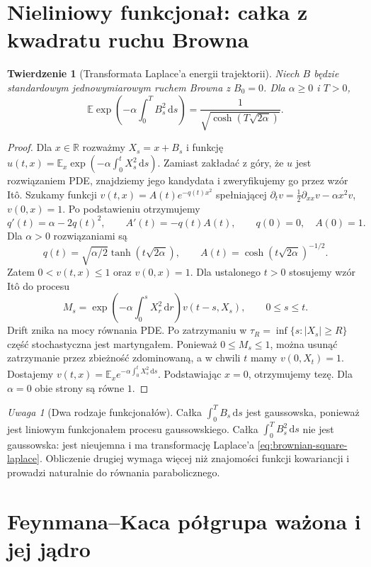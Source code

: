 \documentclass[11pt,a4paper,oneside]{report}
\numberwithin{equation}{chapter}
\theoremstyle{plain}
\newtheorem{twierdzenie}{Twierdzenie}[chapter]
\theoremstyle{definition}
\theoremstyle{remark}
\newtheorem{uwaga}{Uwaga}[chapter]
\newcommand{\R}{\mathbb{R}}
\newcommand{\E}{\mathbb{E}}
\newcommand{\dd}{\mathrm{d}}
\begin{document}
\section{Nieliniowy funkcjonał: całka z kwadratu ruchu Browna}

\begin{twierdzenie}[Transformata Laplace'a energii trajektorii]
\label{th:brownian-square-laplace}
Niech $B$ będzie standardowym jednowymiarowym
ruchem Browna z $B_0=0$. Dla $\alpha\ge0$ i $T>0$,
\[
 \E\exp\left(-\alpha\int_0^T B_s^2\,\dd s\right)
 =\frac1{\sqrt{\cosh(T\sqrt{2\alpha})}}.
\tag{15.7}\label{eq:brownian-square-laplace}
\]
\end{twierdzenie}
\begin{proof}
Dla $x\in\R$ rozważmy $X_s=x+B_s$ i funkcję
$u(t,x)=\E_x\exp(-\alpha\int_0^tX_s^2\,\dd s)$.
Zamiast zakładać z góry, że $u$ jest rozwiązaniem PDE,
znajdziemy jego kandydata i zweryfikujemy go przez
wzór Itô. Szukamy funkcji $v(t,x)=A(t)e^{-q(t)x^2}$
spełniającej
$\partial_tv=\tfrac12\partial_{xx}v-\alpha x^2v$,
$v(0,x)=1$. Po podstawieniu otrzymujemy
\[
 q'(t)=\alpha-2q(t)^2,\qquad
 A'(t)=-q(t)A(t),\qquad q(0)=0,\quad A(0)=1.
\]
Dla $\alpha>0$ rozwiązaniami są
\[
 q(t)=\sqrt{\alpha/2}\tanh(t\sqrt{2\alpha}),\qquad
 A(t)=\cosh(t\sqrt{2\alpha})^{-1/2}.
\]
Zatem $0<v(t,x)\le1$ oraz $v(0,x)=1$.
Dla ustalonego $t>0$ stosujemy wzór Itô do procesu
\[
 M_s=\exp\left(-\alpha\int_0^sX_r^2\,\dd r\right)
 v(t-s,X_s),\qquad 0\le s\le t.
\]
Drift znika na mocy równania PDE. Po zatrzymaniu w
$\tau_R=\inf\{s:|X_s|\ge R\}$ część stochastyczna
jest martyngałem. Ponieważ $0\le M_s\le1$, można
usunąć zatrzymanie przez zbieżność zdominowaną,
a w chwili $t$ mamy $v(0,X_t)=1$. Dostajemy
$v(t,x)=\E_xe^{-\alpha\int_0^tX_s^2\,\dd s}$.
Podstawiając $x=0$, otrzymujemy tezę. Dla
$\alpha=0$ obie strony są równe $1$.
\end{proof}

\begin{uwaga}[Dwa rodzaje funkcjonałów]
Całka $\int_0^T B_s\,\dd s$ jest gaussowska,
ponieważ jest liniowym funkcjonałem procesu
gaussowskiego. Całka $\int_0^T B_s^2\,\dd s$
nie jest gaussowska: jest nieujemna i ma transformację
Laplace'a \eqref{eq:brownian-square-laplace}.
Obliczenie drugiej wymaga więcej niż znajomości
funkcji kowariancji i prowadzi naturalnie do
równania parabolicznego.
\end{uwaga}

\section{Feynmana--Kaca półgrupa ważona i jej jądro}
\end{document}
